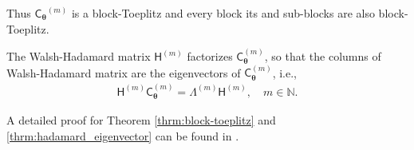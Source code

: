 \documentclass{svjour3}                     %
\newcommand{\bm}[1]{\boldsymbol{#1}}
\newcommand{\naturals}{\mathbb{N}}
\newcommand{\vtheta}{{\bm{\theta}}}
\newcommand{\mC}{\mathsf{C}}
\newcommand{\mCtheta}{{\mathsf{C}_{\vtheta}}}
\newcommand{\mLambda}{\mathsf{\Lambda}}
\newcommand{\mH}{\mathsf{H}}
\begin{document}
\begin{itemize}
	Thus $\mCtheta^{(m)}$ is a block-Toeplitz and every block its and sub-blocks are also block-Toeplitz.
	
	
\end{itemize}
\fi


\begin{theorem}
	\label{thrm:hadamard_eigenvector}
	The Walsh-Hadamard matrix $\mH^{(m)}$ factorizes $\mC_{\vtheta}^{(m)}$, so that the columns of Walsh-Hadamard matrix are the eigenvectors of $\mC_{\vtheta}^{(m)}$, i.e.,
	\begin{align*}
	\mH^{(m)} \mC_{\vtheta}^{(m)}  = \mLambda^{(m)} \mH^{(m)}, \quad m \in \naturals. 
	\end{align*}
\end{theorem}

A detailed proof for Theorem \ref{thrm:block-toeplitz} and \ref{thrm:hadamard_eigenvector} can be found in \cite{JagThesis19a}.
\end{document}
